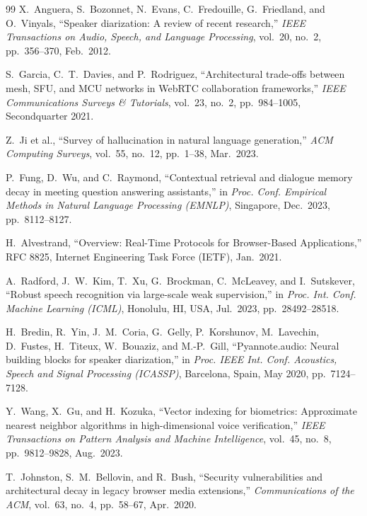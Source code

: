 \documentclass[12pt,oneside,letterpaper]{report}
\numberwithin{equation}{chapter} %
\begin{document}
\begin{singlespace}
\begin{thebibliography}{99}
X.~Anguera, S.~Bozonnet, N.~Evans, C.~Fredouille, G.~Friedland, and O.~Vinyals, ``Speaker diarization: A review of recent research,'' \emph{IEEE Transactions on Audio, Speech, and Language Processing}, vol.~20, no.~2, pp.~356--370, Feb.~2012.

S.~Garcia, C.~T.~Davies, and P.~Rodriguez, ``Architectural trade-offs between mesh, SFU, and MCU networks in WebRTC collaboration frameworks,'' \emph{IEEE Communications Surveys \& Tutorials}, vol.~23, no.~2, pp.~984--1005, Secondquarter 2021.

Z.~Ji et al., ``Survey of hallucination in natural language generation,'' \emph{ACM Computing Surveys}, vol.~55, no.~12, pp.~1--38, Mar.~2023.

P.~Fung, D.~Wu, and C.~Raymond, ``Contextual retrieval and dialogue memory decay in meeting question answering assistants,'' in \emph{Proc. Conf. Empirical Methods in Natural Language Processing (EMNLP)}, Singapore, Dec.~2023, pp.~8112--8127.

H.~Alvestrand, ``Overview: Real-Time Protocols for Browser-Based Applications,'' RFC 8825, Internet Engineering Task Force (IETF), Jan.~2021.

A.~Radford, J.~W.~Kim, T.~Xu, G.~Brockman, C.~McLeavey, and I.~Sutskever, ``Robust speech recognition via large-scale weak supervision,'' in \emph{Proc. Int. Conf. Machine Learning (ICML)}, Honolulu, HI, USA, Jul.~2023, pp.~28492--28518.

H.~Bredin, R.~Yin, J.~M.~Coria, G.~Gelly, P.~Korshunov, M.~Lavechin, D.~Fustes, H.~Titeux, W.~Bouaziz, and M.-P.~Gill, ``Pyannote.audio: Neural building blocks for speaker diarization,'' in \emph{Proc. IEEE Int. Conf. Acoustics, Speech and Signal Processing (ICASSP)}, Barcelona, Spain, May 2020, pp.~7124--7128.

Y.~Wang, X.~Gu, and H.~Kozuka, ``Vector indexing for biometrics: Approximate nearest neighbor algorithms in high-dimensional voice verification,'' \emph{IEEE Transactions on Pattern Analysis and Machine Intelligence}, vol.~45, no.~8, pp.~9812--9828, Aug.~2023.

T.~Johnston, S.~M.~Bellovin, and R.~Bush, ``Security vulnerabilities and architectural decay in legacy browser media extensions,'' \emph{Communications of the ACM}, vol.~63, no.~4, pp.~58--67, Apr.~2020.


\end{thebibliography}
\end{singlespace}
\end{document}
